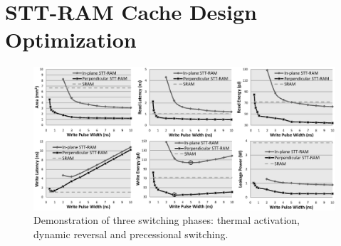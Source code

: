 \section{STT-RAM Cache Design Optimization} \label{sec:opt}

\begin{figure}[t]
  \centering
  \includegraphics[width=7in]{fig/AllMetrics.eps}
  \caption{Demonstration of three switching phases: thermal activation, dynamic reversal and precessional switching.}
  \label{fig:metrics}
\end{figure}